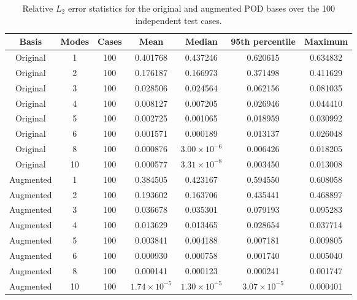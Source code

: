 \begin{table}[htbp]
    \centering
    \caption{Relative $L_2$ error statistics for the original
    and augmented POD bases over the 100 independent test cases.}
    \label{tab:independent_error_statistics}
    \scriptsize
    \begin{tabular}{ccccccc}
        \toprule
        \textbf{Basis} &
        \textbf{Modes} &
        \textbf{Cases} &
        \textbf{Mean} &
        \textbf{Median} &
        \textbf{95th percentile} &
        \textbf{Maximum} \\
        \midrule
        Original  & 1  & 100 & 0.401768 & 0.437246 & 0.620615 & 0.634832 \\
        Original  & 2  & 100 & 0.176187 & 0.166973 & 0.371498 & 0.411629 \\
        Original  & 3  & 100 & 0.028506 & 0.024564 & 0.062156 & 0.081035 \\
        Original  & 4  & 100 & 0.008127 & 0.007205 & 0.026946 & 0.044410 \\
        Original  & 5  & 100 & 0.002725 & 0.001065 & 0.018959 & 0.030992 \\
        Original  & 6  & 100 & 0.001571 & 0.000189 & 0.013137 & 0.026048 \\
        Original  & 8  & 100 & 0.000876 & $3.00\times10^{-6}$ & 0.006426 & 0.018205 \\
        Original  & 10 & 100 & 0.000577 & $3.31\times10^{-8}$ & 0.003450 & 0.013008 \\
        \midrule
        Augmented & 1  & 100 & 0.384505 & 0.423167 & 0.594550 & 0.608058 \\
        Augmented & 2  & 100 & 0.193602 & 0.163706 & 0.435441 & 0.468897 \\
        Augmented & 3  & 100 & 0.036678 & 0.035301 & 0.079193 & 0.095283 \\
        Augmented & 4  & 100 & 0.013629 & 0.013465 & 0.028654 & 0.037714 \\
        Augmented & 5  & 100 & 0.003841 & 0.004188 & 0.007181 & 0.009805 \\
        Augmented & 6  & 100 & 0.000930 & 0.000758 & 0.001740 & 0.005040 \\
        Augmented & 8  & 100 & 0.000141 & 0.000123 & 0.000241 & 0.001747 \\
        Augmented & 10 & 100 & $1.74\times10^{-5}$ & $1.30\times10^{-5}$ & $3.07\times10^{-5}$ & 0.000401 \\
        \bottomrule
    \end{tabular}
\end{table}

